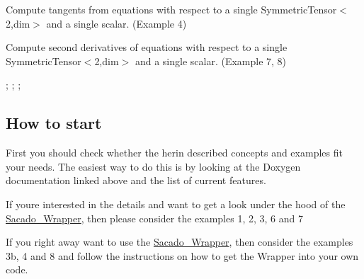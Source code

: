 \begin{DoxyItemize}
\item Compute tangents from equations with respect to a single Symmetric\+Tensor$<$2,dim$>$ and a single scalar. (Example 4)
\end{DoxyItemize}

\href{https://www.codecogs.com/eqnedit.php?latex=\boldsymbol{A,&space;B,&space;}&space;\overset{4}{C}&space;\textrm{&space;and&space;}&space;$D$&space;\textrm{&space;at&space;the&space;same&space;time}}{\tt }


\begin{DoxyItemize}
\item Compute second derivatives of equations with respect to a single Symmetric\+Tensor$<$2,dim$>$ and a single scalar. (Example 7, 8)
\end{DoxyItemize}

\href{https://www.codecogs.com/eqnedit.php?latex=\overset{4}{C}&space;=&space;\frac{\partial^2\Psi}{\partial\boldsymbol{\varepsilon&space;}^2}}{\tt } ; \href{https://www.codecogs.com/eqnedit.php?latex=\boldsymbol{E}&space;=&space;\frac{\partial^2\Psi}{\partial\boldsymbol{\varepsilon&space;}&space;\partial\varphi&space;}}{\tt } ; \href{https://www.codecogs.com/eqnedit.php?latex=\boldsymbol{F}&space;=&space;\frac{\partial^2\Psi}{\partial\varphi&space;\partial\boldsymbol{\varepsilon&space;}&space;}}{\tt } ; \href{https://www.codecogs.com/eqnedit.php?latex=G&space;=&space;\frac{\partial^2\Psi}{\partial\varphi^2&space;}}{\tt }

\subsection*{How to start}


\begin{DoxyItemize}
\item First you should check whether the herin described concepts and examples fit your needs. The easiest way to do this is by looking at the Doxygen documentation linked above and the list of current features.
\item If you\textquotesingle{}re interested in the details and want to get a look under the hood of the \hyperlink{namespaceSacado__Wrapper}{Sacado\+\_\+\+Wrapper}, then please consider the examples 1, 2, 3, 6 and 7
\item If you right away want to use the \hyperlink{namespaceSacado__Wrapper}{Sacado\+\_\+\+Wrapper}, then consider the examples 3b, 4 and 8 and follow the instructions on how to get the Wrapper into your own code.
\end{DoxyItemize}

